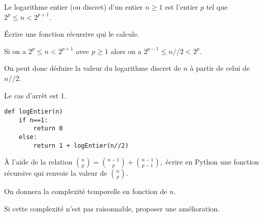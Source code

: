 \begin{Exercise}[title = {Logarithme entier}]

Le logarithme entier (ou discret) d'un entier $n\ge 1$ est l'entier $p$ tel que 
$2^p \le n < 2^{p+1}$.

Écrire une fonction récursive  qui le calcule.
\end{Exercise}
\begin{Answer}

Si on a $2^p \le n < 2^{p+1}$ avec $p\ge 1$ alors on a $2^{p-1} \le n//2 < 2^p$.

On peut donc déduire la valeur du logarithme discret de $n$ à partir de celui de $n//2$.

Le cas d'arrêt est 1.

\begin{lstlisting}
def logEntier(n)
    if n==1:
        return 0
    else:
        return 1 + logEntier(n//2)
\end{lstlisting}
\end{Answer}
\begin{Exercise}[title = {Coefficients binomiaux}]
À l'aide de la relation $\binom{n}{p}=\binom{n-1}{p}+\binom{n-1}{p-1},$ écrire en Python une fonction récursive   qui renvoie la valeur de $\binom{n}{p}$.

On donnera la complexité temporelle en fonction de  $n$.

Si cette complexité n'est pas raisonnable, proposer une amélioration.
\end{Exercise}
